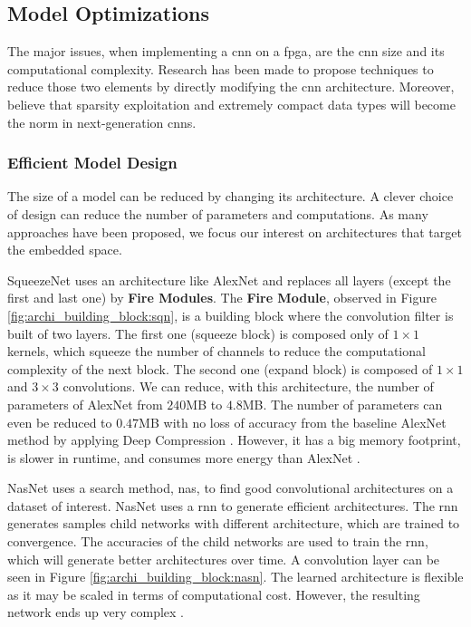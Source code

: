 \subsection{Model Optimizations} \label{subsec:mdopti}
The major issues, when implementing a \acrshort{cnn} on a \acrshort{fpga}, are the \acrshort{cnn} size and its computational complexity. Research has been made to propose techniques to reduce those two elements by directly modifying the \acrshort{cnn} architecture. Moreover, \textcite{nurvitadhi_can_2017} believe that sparsity exploitation and extremely compact data types will become the norm in next-generation \acrshort{cnn}s.
%
%
\subsubsection{Efficient Model Design}
The size of a model can be reduced by changing its architecture. A clever choice of design can reduce the number of parameters and computations. As many approaches have been proposed, we focus our interest on architectures that target the embedded space.

SqueezeNet \cite{iandola_squeezenet_2016} uses an architecture like AlexNet and replaces all layers (except the first and last one) by \textbf{Fire Modules}. The \textbf{Fire Module}, observed in Figure \ref{fig:archi_building_block:sqn}, is a building block where the convolution filter is built of two layers. The first one (squeeze block) is composed only of $1 \times 1$ kernels, which squeeze the number of channels to reduce the computational complexity of the next block. The second one (expand block) is composed of $1 \times 1$ and $3 \times 3$ convolutions. We can reduce, with this architecture, the number of parameters of AlexNet from $240$MB to $4.8$MB. The number of parameters can even be reduced to $0.47$MB with no loss of accuracy from the baseline AlexNet method by applying Deep Compression \cite{han_deep_2016}. However, it has a big memory footprint, is slower in runtime, and consumes more energy than AlexNet \cite{sze_efficient_2017}.

NasNet \cite{zoph_learning_2018} uses a search method, \acrfull{nas}, to find good convolutional architectures on a dataset of interest. NasNet uses a \acrfull{rnn} to generate efficient architectures. The \acrshort{rnn} generates samples child networks with different architecture, which are trained to convergence. The accuracies of the child networks are used to train the \acrshort{rnn}, which will generate better architectures over time. A convolution layer can be seen in Figure \ref{fig:archi_building_block:nasn}. The learned architecture is flexible as it may be scaled in terms of computational cost. However, the resulting network ends up very complex \cite{sandler_mobilenetv2_2019}.

